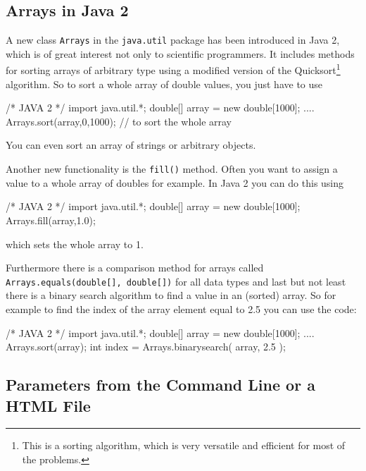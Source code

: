 \subsection{Arrays in Java 2}
A new class \verb|Arrays| in the \verb|java.util| package has been
introduced in Java 2, which is of great interest not only to scientific
programmers. It includes methods for sorting arrays of arbitrary
type using a modified version of the Quicksort\footnote{This is
a sorting algorithm, which is very versatile and efficient for
most of the problems.} algorithm. So to sort a whole array 
of double values, you just have to use
\begin{sverbatim}
  /* JAVA 2 */
  import java.util.*;
  double[] array = new double[1000];
  ....
  Arrays.sort(array,0,1000); // to sort the whole array
\end{sverbatim}
You can even sort an array of strings or arbitrary objects.

Another new functionality is the \verb|fill()| method. Often you
want to assign a value to a whole array of doubles for example.
In Java 2 you can do this using
\begin{sverbatim}
  /* JAVA 2 */
  import java.util.*;
  double[] array = new double[1000];
  Arrays.fill(array,1.0);
\end{sverbatim}
which sets the whole array to 1.

Furthermore there is a comparison method for arrays called
\verb|Arrays.equals(double[], double[])| for all data types and
last but not least there is a binary search algorithm to
find a value in an (sorted) array. So for example to find the index of the
array element equal to 2.5 you can use the code:
\begin{sverbatim}
  /* JAVA 2 */
  import java.util.*;
  double[] array = new double[1000];
  ....
  Arrays.sort(array);
  int index = Arrays.binarysearch( array, 2.5 );
\end{sverbatim}

\subsection{Parameters from the Command Line or a HTML File}
\label{sec:Parameter}


